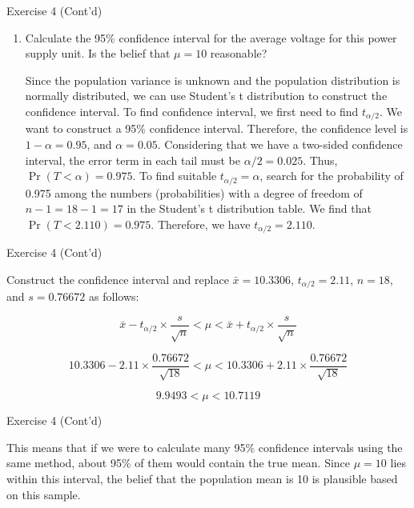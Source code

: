 \documentclass[
  ignorenonframetext,
  aspectratio=43,
]{beamer}
\let\olditem\item
\renewcommand\item{\olditem\justifying}
\begin{document}
\begin{frame}{Exercise 4 (Cont'd)}
\protect\hypertarget{exercise-4-contd}{}
\begin{enumerate}
\item
  Calculate the 95\% confidence interval for the average voltage for
  this power supply unit. Is the belief that \(\mu = 10\) reasonable?

  \pause

  Since the population variance is unknown and the population
  distribution is normally distributed, we can use Student's t
  distribution to construct the confidence interval. To find confidence
  interval, we first need to find \(t_{\alpha/2}\). We want to construct
  a 95\% confidence interval. Therefore, the confidence level is
  \(1-\alpha = 0.95\), and \(\alpha = 0.05\). Considering that we have a
  two-sided confidence interval, the error term in each tail must be
  \(\alpha/2 = 0.025\). Thus, \(\Pr(T < \alpha) = 0.975\). To find
  suitable \(t_{\alpha/2} = \alpha\), search for the probability of
  0.975 among the numbers (probabilities) with a degree of freedom of
  \(n-1 = 18-1 = 17\) in the Student's t distribution table. We find
  that \(\Pr(T < 2.110) = 0.975\). Therefore, we have
  \(t_{\alpha/2} = 2.110\).
\end{enumerate}
\end{frame}

\begin{frame}{Exercise 4 (Cont'd)}
\protect\hypertarget{exercise-4-contd-1}{}
\pause

Construct the confidence interval and replace \(\bar{x} = 10.3306\),
\(t_{\alpha/2} = 2.11\), \(n = 18\), and \(s = 0.76672\) as follows:

\pause

\[
\bar{x} - t_{\alpha/2} \times \frac{s}{\sqrt{n}} < \mu < \bar{x} + t_{\alpha/2} \times \frac{s}{\sqrt{n}}
\]

\pause

\[
10.3306 - 2.11 \times \frac{0.76672}{\sqrt{18}} < \mu < 10.3306 + 2.11 \times \frac{0.76672}{\sqrt{18}}
\]

\pause

\[
9.9493 < \mu < 10.7119
\]
\end{frame}

\begin{frame}{Exercise 4 (Cont'd)}
\protect\hypertarget{exercise-4-contd-2}{}
\pause

This means that if we were to calculate many 95\% confidence intervals
using the same method, about 95\% of them would contain the true mean.
Since \(\mu = 10\) lies within this interval, the belief that the
population mean is 10 is plausible based on this sample.
\end{frame}
\end{document}
